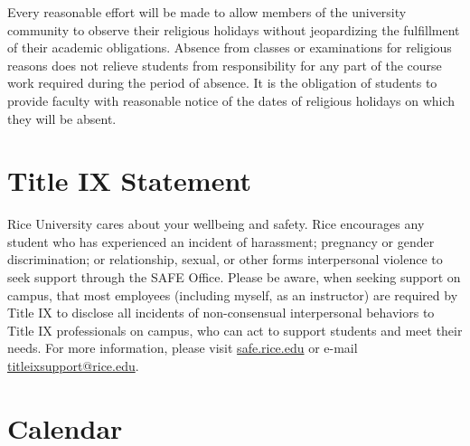 Every reasonable effort will be made to allow members of the university community to observe their religious holidays without jeopardizing the fulfillment of their academic obligations. Absence from classes or examinations for religious reasons does not relieve students from responsibility for any part of the course work required during the period of absence. It is the obligation of students to provide faculty with reasonable notice of the dates of religious holidays on which they will be absent. 





%
%
%
%

\section{Title IX Statement}

Rice University cares about your wellbeing and safety. Rice encourages any student who has experienced an incident of harassment; pregnancy or gender discrimination; or relationship, sexual, or other forms interpersonal violence to seek support through the SAFE Office. Please be aware, when seeking support on campus, that most employees (including myself, as an instructor) are required by Title IX to disclose all incidents of non-consensual interpersonal behaviors to Title IX professionals on campus, who can act to support students and meet their needs. For more information, please visit \href{https://safe.rice.edu/}{safe.rice.edu} or e-mail \href{mailto:titleixsupport@rice.edu}{titleixsupport@rice.edu}.





%
%
%
%


\section{Calendar}
\label{sec : Calendar}

